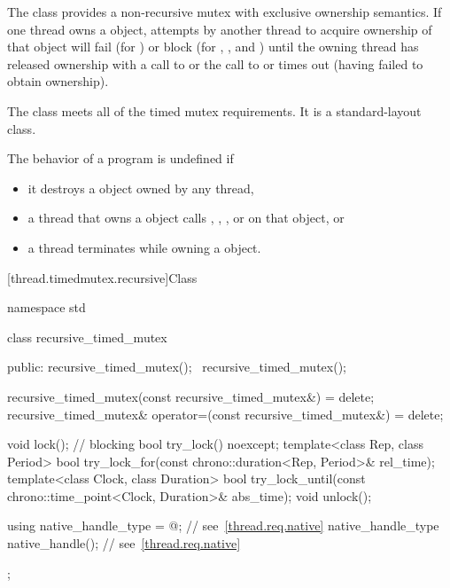 \pnum
{}%
The class  provides a non-recursive mutex with exclusive ownership
semantics. If one thread owns a  object, attempts by another thread
to acquire ownership of that object will fail (for ) or block
(for , , and ) until
the owning thread has released ownership with a call to  or the
call to  or  times out (having
failed to obtain ownership).

\pnum
The class  meets
all of the timed mutex requirements.
It is a standard-layout class.

\pnum
The behavior of a program is undefined if
\begin{itemize}
\item it destroys a  object owned by any thread,
\item a thread that owns a  object calls ,
, , or  on that object, or
\item a thread terminates while owning a  object.
\end{itemize}

[thread.timedmutex.recursive]{Class }

%
\begin{codeblock}
namespace std {
  class recursive_timed_mutex {
  public:
    recursive_timed_mutex();
    ~recursive_timed_mutex();

    recursive_timed_mutex(const recursive_timed_mutex&) = delete;
    recursive_timed_mutex& operator=(const recursive_timed_mutex&) = delete;

    void lock();    // blocking
    bool try_lock() noexcept;
    template<class Rep, class Period>
      bool try_lock_for(const chrono::duration<Rep, Period>& rel_time);
    template<class Clock, class Duration>
      bool try_lock_until(const chrono::time_point<Clock, Duration>& abs_time);
    void unlock();

    using native_handle_type = @\impdefnc@;          // see~\ref{thread.req.native}
    native_handle_type native_handle();                         // see~\ref{thread.req.native}
  };
}
\end{codeblock}


